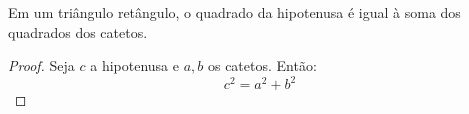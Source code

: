 

\begin{theorem}[Pitágoras]
\label{thm:pitagoras}
Em um triângulo retângulo, o quadrado da hipotenusa é igual à soma dos quadrados dos catetos.
\end{theorem}

\begin{proof}
Seja $c$ a hipotenusa e $a, b$ os catetos. Então:
\begin{equation}
    c^2 = a^2 + b^2
\end{equation}
\end{proof}



